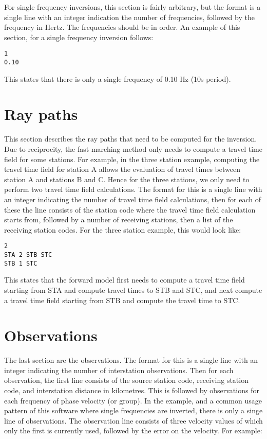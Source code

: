\documentclass[a4paper,12pt]{article}
\begin{document}
For single frequency inversions, this section is fairly arbitrary, but
the format is a single line with an integer indication the number of
frequencies, followed by the frequency in Hertz. The frequencies
should be in order. An example of this section, for a single frequency
inversion follows:

\begin{verbatim}
1
0.10
\end{verbatim}

This states that there is only a single frequency of 0.10 Hz (10s period).

\section{Ray paths}

This section describes the ray paths that need to be computed for the
inversion. Due to reciprocity, the fast marching method only needs to
compute a travel time field for some stations. For example, in the
three station example, computing the travel time field for station A
allows the evaluation of travel times between station A and stations B
and C.  Hence for the three stations, we only need to perform two
travel time field calculations.  The format for this is a single line
with an integer indicating the number of travel time field
calculations, then for each of these the line consists of the station
code where the travel time field calculation starts from, followed by
a number of receiving stations, then a list of the receiving station
codes. For the three station example, this would look like:

\begin{verbatim}
2
STA 2 STB STC
STB 1 STC
\end{verbatim}

This states that the forward model first needs to compute a travel
time field starting from STA and compute travel times to STB and STC,
and next compute a travel time field starting from STB and compute the
travel time to STC.

\section{Observations}

The last section are the observations. The format for this is a single line with an
integer indicating the number of interstation observations. Then for each observation,
the first line consists of the source station code, receiving station code, and interstation
distance in kilometres. This is followed by observations for each frequency of phase velocity
(or group). In the example, and a common usage pattern of this software where single frequencies
are inverted, there is only a singe line of observations. The observation line consists of three velocity
values of which only the first is currently used, followed by the error on the velocity. For example:
\end{document}
